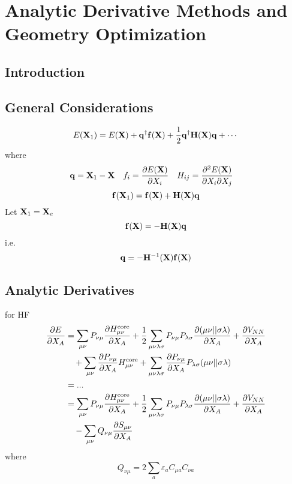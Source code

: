 \documentclass[a4paper]{article}
\DeclareMathOperator{\core}{\mathrm{core}}
\numberwithin{equation}{section}
\begin{document}
\section{Analytic Derivative Methods and Geometry Optimization}
\subsection{Introduction}

\subsection{General Considerations}
\begin{equation}\label{key}
E(\vb{X}_1) = E(\vb{X}) + \vb{q}^\dagger \vb{f}(\vb{X}) + \dfrac{1}{2}\vb{q}^\dagger \vb{H}(\vb{X}) \vb{q} + \cdots
\end{equation}
where
\begin{align}
& \vb{q} = \vb{X}_1 - \vb{X} && f_i = \pdv{E(\vb{X})}{X_i} && H_{ij} = \pdv{E(\vb{X})}{X_i}{X_j} &
\end{align}
\begin{equation}\label{key}
\vb{f}(\vb{X}_1) = \vb{f}(\vb{X}) + \vb{H}(\vb{X})\vb{q}
\end{equation}
Let $ \vb{X}_1 = \vb{X}_e $
\begin{equation}\label{key}
\vb{f}(\vb{X}) = - \vb{H}(\vb{X})\vb{q}
\end{equation}
i.e.
\begin{equation}\label{key}
\vb{q} = - \vb{H}^{-1}(\vb{X})\vb{f}(\vb{X})
\end{equation}

\subsection{Analytic Derivatives}
for HF
\begin{align}
\pdv{E}{X_A} &= \sum_{\mu\nu} P_{\nu\mu} \pdv{H_{\mu\nu}^{\core}}{X_A} 
+ \dfrac{1}{2}\sum_{\mu\nu\lambda\sigma} P_{\nu\mu}P_{\lambda\sigma} \pdv{(\mu\nu||\sigma\lambda)}{X_A} 
+ \pdv{V_{NN}}{X_A} \notag\\
&\quad {}
+ \sum_{\mu\nu} \pdv{P_{\nu\mu}}{X_A} H_{\mu\nu}^{\core}
+ \sum_{\mu\nu\lambda\sigma} \pdv{P_{\nu\mu}}{X_A}P_{\lambda\sigma} (\mu\nu||\sigma\lambda) \notag\\
&= ... \notag\\
&= \sum_{\mu\nu} P_{\nu\mu} \pdv{H_{\mu\nu}^{\core}}{X_A} 
+ \dfrac{1}{2}\sum_{\mu\nu\lambda\sigma} P_{\nu\mu}P_{\lambda\sigma} \pdv{(\mu\nu||\sigma\lambda)}{X_A} 
+ \pdv{V_{NN}}{X_A} \notag\\
&\quad {} - \sum_{\mu\nu} Q_{\nu\mu} \pdv{S_{\mu\nu}}{X_A}
\end{align}
where
\begin{equation}\label{key}
Q_{\nu\mu} = 2\sum_a \varepsilon_a C_{\mu a} C_{\nu a}
\end{equation}
\end{document}
